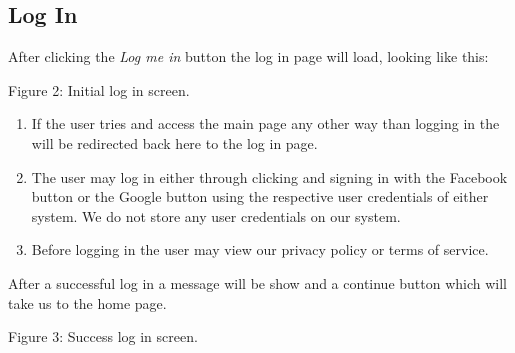 \documentclass[hidelinks,english]{article}
\begin{document}
    \subsection{Log In}
            After clicking the \textit{Log me in} button the log in page will load, looking like this:
            \begin{center}
              Figure 2: Initial log in screen.
              \label{Log In}
            \end{center}
        \begin{enumerate}  
            \item If the user tries and access the main page any other way than logging in the will be redirected back here to the log in page. 
            \item The user may log in either through clicking and signing in with the Facebook button or the Google button using the respective user credentials of either system. We do not store any user credentials on our system.
            \item Before logging in the user may view our privacy policy or terms of service. 
        \end{enumerate}
        
        After a successful log in a  message will be show and a continue button which will take us to the home page.
        \begin{center}
          Figure 3: Success log in screen.
          \label{Log In Success}
        \end{center}
        
\end{document}
